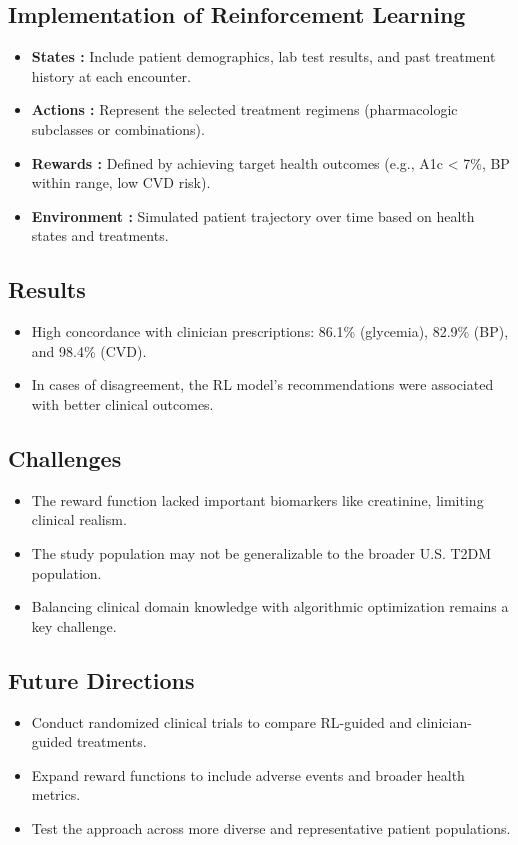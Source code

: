 \subsection*{Implementation of Reinforcement Learning}
\begin{itemize}
    \item \textbf{States :} Include patient demographics, lab test results, and past treatment history at each encounter.
    \item \textbf{Actions :} Represent the selected treatment regimens (pharmacologic subclasses or combinations).
    \item \textbf{Rewards :} Defined by achieving target health outcomes (e.g., A1c < 7\%, BP within range, low CVD risk).
    \item \textbf{Environment :} Simulated patient trajectory over time based on health states and treatments.
\end{itemize}

\subsection*{Results}
\begin{itemize}
    \item High concordance with clinician prescriptions: 86.1\% (glycemia), 82.9\% (BP), and 98.4\% (CVD).
    \item In cases of disagreement, the RL model's recommendations were associated with better clinical outcomes.
\end{itemize}

\subsection*{Challenges}
\begin{itemize}
    \item The reward function lacked important biomarkers like creatinine, limiting clinical realism.
    \item The study population may not be generalizable to the broader U.S. T2DM population.
    \item Balancing clinical domain knowledge with algorithmic optimization remains a key challenge.
\end{itemize}

\subsection*{Future Directions}
\begin{itemize}
    \item Conduct randomized clinical trials to compare RL-guided and clinician-guided treatments.
    \item Expand reward functions to include adverse events and broader health metrics.
    \item Test the approach across more diverse and representative patient populations.
\end{itemize}


